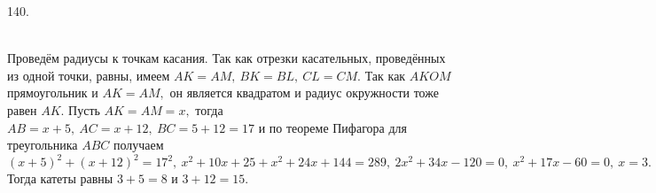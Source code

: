 140. \begin{figure}[ht!]
\end{figure}\\
Проведём радиусы к точкам касания. Так как отрезки касательных, проведённых из одной точки, равны, имеем $AK=AM,\ BK=BL,\ CL=CM.$ Так как $AKOM$ прямоугольник и $AK=AM,$ он является квадратом и радиус окружности тоже равен $AK.$ Пусть $AK=AM=x,$ тогда $AB=x+5,\ AC=x+12,\ BC=5+12=17$ и по теореме Пифагора для треугольника $ABC$ получаем $(x+5)^2+(x+12)^2=17^2,\ x^2+10x+25+x^2+24x+144=289,\ 2x^2+34x-120=0,\ x^2+17x-60=0,\ x=3.$ Тогда катеты равны $3+5=8$ и $3+12=15.$\\
